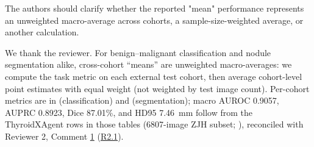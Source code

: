 \label{rev:R2.7}
\begin{reviewercomment}
The authors should clarify whether the reported "mean" performance represents an unweighted macro-average across cohorts, a sample-size-weighted average, or another calculation.
\end{reviewercomment}
\begin{authorresponse}
We thank the reviewer. For benign--malignant classification and nodule segmentation alike, cross-cohort ``means'' are unweighted macro-averages: we compute the task metric on each external test cohort, then average cohort-level point estimates with equal weight (not weighted by test image count). Per-cohort metrics are in  (classification) and  (segmentation); macro AUROC 0.9057, AUPRC 0.8923, Dice 87.01\%, and HD95 7.46~mm follow from the ThyroidXAgent rows in those tables (6807-image ZJH subset; ), reconciled with Reviewer 2, Comment \hyperref[rev:R2.1]{1} (\hyperref[rev:R2.1]{R2.1}).\par
\par
\end{authorresponse}

